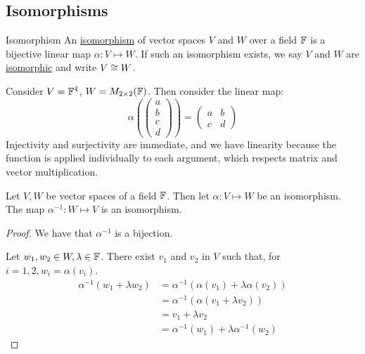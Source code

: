 \documentclass[../Main.tex]{subfiles}
\begin{document}
\subsection{Isomorphisms}
\begin{definition}{Isomorphism}
    An \underline{isomorphism} of vector spaces $V$ and $W$ over a field $\mathbb{F}$ is a bijective linear map $\alpha : V \mapsto W$. If such an isomorphism exists, we say $V$ and $W$ are \underline{isomorphic} and write $V \cong W$.
\end{definition}
\begin{example}
    Consider $V = \mathbb{F}^4$, $W = M_{2 \times 2}(\mathbb{F})$. Then consider the linear map:
    \begin{equation*}
        \alpha\left(\begin{pmatrix}a \\ b \\ c \\ d\end{pmatrix}\right) = \begin{pmatrix}a & b \\ c & d\end{pmatrix}
    \end{equation*}
    Injectivity and surjectivity are immediate, and we have linearity because the function is applied individually to each argument, which respects matrix and vector multiplication.
\end{example}
\begin{proposition}
    Let $V, W$ be vector spaces of a field $\mathbb{F}$. Then let $\alpha : V \mapsto W$ be an isomorphism.
    The map $\alpha^{-1} : W \mapsto V$ is an isomorphism.
    \label{propInverseIsomorphism}
\end{proposition}
\begin{proof}
    We have that $\alpha^{-1}$ is a bijection.

    Let $w_1, w_2 \in W, \lambda \in \mathbb{F}$.
    There exist $v_1$ and $v_2$ in $V$ such that, for $i = 1, 2, w_i = \alpha(v_i)$.
    \begin{align*}
        \alpha^{-1}(w_1 + \lambda w_2) &= \alpha^{-1}(\alpha(v_1) + \lambda \alpha(v_2)) \\
        &= \alpha^{-1} (\alpha(v_1 + \lambda v_2)) \\
        &= v_1 + \lambda v_2 \\
        &= \alpha^{-1}(w_1) + \lambda \alpha^{-1}(w_2)
    \end{align*}
\end{proof}
\end{document}
